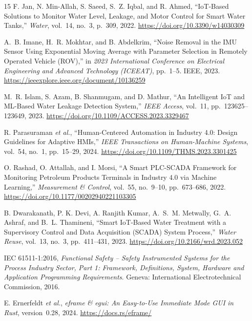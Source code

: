\documentclass[12pt,a4paper]{article}
\begin{document}
\begin{thebibliography}{15}
F. Jan, N. Min-Allah, S. Saeed, S.~Z. Iqbal, and R. Ahmed,
``IoT-Based Solutions to Monitor Water Level, Leakage, and Motor Control for Smart Water Tanks,''
\textit{Water}, vol.~14, no.~3, p.~309, 2022.
\url{https://doi.org/10.3390/w14030309}

A.~B. Imane, H.~R. Mokhtar, and B. Abdelkrim,
``Noise Removal in the IMU Sensor Using Exponential Moving Average with Parameter Selection in Remotely Operated Vehicle (ROV),''
in \textit{2023 International Conference on Electrical Engineering and Advanced Technology (ICEEAT)},
pp.~1--5. IEEE, 2023.
\url{https://ieeexplore.ieee.org/document/10136259}

M.~R. Islam, S. Azam, B. Shanmugam, and D. Mathur,
``An Intelligent IoT and ML-Based Water Leakage Detection System,''
\textit{IEEE Access}, vol.~11, pp.~123625--123649, 2023.
\url{https://doi.org/10.1109/ACCESS.2023.3329467}

R. Parasuraman \textit{et al.},
``Human-Centered Automation in Industry 4.0: Design Guidelines for Adaptive HMIs,''
\textit{IEEE Transactions on Human-Machine Systems},
vol.~54, no.~1, pp.~15--29, 2024.
\url{https://doi.org/10.1109/THMS.2023.3301425}

O. Rashad, O. Attallah, and I. Morsi,
``A Smart PLC-SCADA Framework for Monitoring Petroleum Products Terminals in Industry 4.0 via Machine Learning,''
\textit{Measurement \& Control}, vol.~55, no.~9--10, pp.~673--686, 2022.
\url{https://doi.org/10.1177/00202940221103305}

B. Dwarakanath, P. K. Devi, A. Ranjith Kumar, A.~S.~M. Metwally, G.~A. Ashraf, and B.~L. Thamineni,
``Smart IoT-Based Water Treatment with a Supervisory Control and Data Acquisition (SCADA) System Process,''
\textit{Water Reuse}, vol.~13, no.~3, pp.~411--431, 2023.
\url{https://doi.org/10.2166/wrd.2023.052}

IEC 61511-1:2016,
\textit{Functional Safety -- Safety Instrumented Systems for the Process Industry Sector,
Part 1: Framework, Definitions, System, Hardware and Application Programming Requirements}.
Geneva: International Electrotechnical Commission, 2016.

E. Ernerfeldt \textit{et al.},
\textit{eframe \& egui: An Easy-to-Use Immediate Mode GUI in Rust},
version~0.28, 2024.
\url{https://docs.rs/eframe/}

\end{thebibliography}
\end{document}
